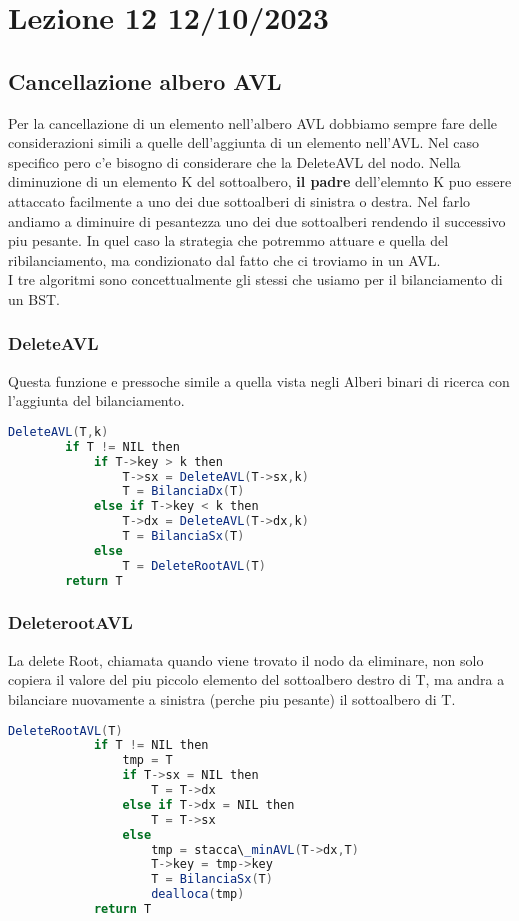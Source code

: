\section{Lezione 12 12/10/2023}
\subsection{Cancellazione albero AVL}

Per la cancellazione di un elemento nell'albero AVL dobbiamo sempre fare delle considerazioni simili a quelle dell'aggiunta di un elemento nell'AVL. Nel caso specifico pero c'e bisogno di considerare che la DeleteAVL del nodo.
Nella diminuzione di un elemento K del sottoalbero, \textbf{il padre} dell'elemnto K puo essere attaccato facilmente a uno dei due sottoalberi di sinistra o destra.
Nel farlo andiamo a diminuire di pesantezza uno dei due sottoalberi rendendo il successivo piu pesante. In quel caso la strategia che potremmo attuare e quella del ribilanciamento, ma condizionato dal fatto che ci troviamo in un AVL.\\

I tre algoritmi sono concettualmente gli stessi che usiamo per il bilanciamento di un BST.

\subsubsection{DeleteAVL}
Questa funzione e pressoche simile a quella vista negli Alberi binari di ricerca con l'aggiunta del bilanciamento.

\begin{lstlisting}[language=Java]
	DeleteAVL(T,k)
		if T != NIL then
			if T->key > k then
				T->sx = DeleteAVL(T->sx,k)
				T = BilanciaDx(T)
			else if T->key < k then
				T->dx = DeleteAVL(T->dx,k)
				T = BilanciaSx(T)
			else 
				T = DeleteRootAVL(T)
		return T
\end{lstlisting}

\subsubsection{DeleterootAVL}
La delete Root, chiamata quando viene trovato il nodo da eliminare, non solo copiera il valore del piu piccolo elemento del sottoalbero destro di T, ma andra a bilanciare nuovamente a sinistra (perche piu pesante) il sottoalbero di T.

	\begin{lstlisting}[language=Java]
		DeleteRootAVL(T)
			if T != NIL then
				tmp = T
				if T->sx = NIL then
					T = T->dx
				else if T->dx = NIL then
					T = T->sx
				else
					tmp = stacca\_minAVL(T->dx,T)
					T->key = tmp->key
					T = BilanciaSx(T)
					dealloca(tmp)
			return T
	\end{lstlisting}

